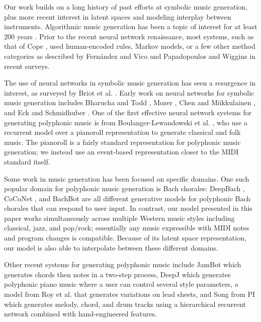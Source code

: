 \documentclass{article}
\begin{document}
Our work builds on a long history of past efforts at symbolic music generation, plus more recent interest in latent spaces and modeling interplay between instruments.  Algorithmic music generation has been a topic of interest for at least 200 years \cite{kirnberger1767allezeit,menabrea1843sketch,roure2016numbers}.  Prior to the recent neural network renaissance, most systems, such as that of Cope \cite{cope1991computers}, used human-encoded rules, Markov models, or a few other method categories as described by Fern{\'a}ndez and Vico \cite{fernandez2013ai} and Papadopoulos and Wiggins \cite{papadopoulos1999ai} in recent surveys.

The use of neural networks in symbolic music generation has seen a resurgence in interest, as surveyed by Briot et al. \cite{briot2017deep}.  Early work on neural networks for symbolic music generation includes Bharucha and Todd \cite{bharucha1989modeling}, Mozer \cite{mozer1991connectionist}, Chen and Miikkulainen \cite{chen2001creating}, and Eck and Schmidhuber \cite{eck2002finding}.  One of the first effective neural network systems for generating polyphonic music is from Boulanger-Lewandowski et al. \cite{boulanger2012modeling}, who use a recurrent model over a pianoroll representation to generate classical and folk music.  The pianoroll is a fairly standard representation for polyphonic music generation; we instead use an event-based representation closer to the MIDI standard itself.

Some work in music generation has been focused on specific domains.  One such popular domain for polyphonic music generation is Bach chorales: DeepBach \cite{hadjeres2016deepbach}, CoCoNet \cite{huang2017coco}, and BachBot \cite{liang2017automatic} are all different generative models for polyphonic Bach chorales that can respond to user input.  In contrast, our model presented in this paper works simultaneously across multiple Western music styles including classical, jazz, and pop/rock; essentially any music expressible with MIDI notes and program changes is compatible.  Because of its latent space representation, our model is also able to interpolate between these different domains.

Other recent systems for generating polyphonic music include JamBot \cite{brunner2017jambot} which generates chords then notes in a two-step process, DeepJ \cite{mao2018deepj} which generates polyphonic piano music where a user can control several style parameters, a model from Roy et al. \cite{Roy2017SamplingVO} that generates variations on lead sheets, and Song from PI \cite{DBLP:journals/corr/ChuUF16} which generates melody, chord, and drum tracks using a hierarchical recurrent network combined with hand-engineered features.
\end{document}
